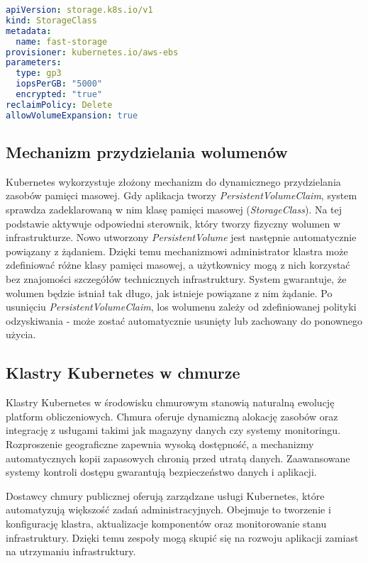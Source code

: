 \begin{lstlisting}[language=yaml,caption={Przykładowa definicja StorageClass},label={lst:sc-example}]
apiVersion: storage.k8s.io/v1
kind: StorageClass
metadata:
  name: fast-storage
provisioner: kubernetes.io/aws-ebs
parameters:
  type: gp3
  iopsPerGB: "5000"
  encrypted: "true"
reclaimPolicy: Delete
allowVolumeExpansion: true
\end{lstlisting}

\subsection{Mechanizm przydzielania wolumenów}
Kubernetes wykorzystuje złożony mechanizm do dynamicznego przydzielania zasobów pamięci masowej.
Gdy aplikacja tworzy \textit{PersistentVolumeClaim}, system sprawdza zadeklarowaną w nim klasę pamięci masowej (\textit{StorageClass}).
Na tej podstawie aktywuje odpowiedni sterownik, który tworzy fizyczny wolumen w infrastrukturze.
Nowo utworzony \textit{PersistentVolume} jest następnie automatycznie powiązany z żądaniem.
Dzięki temu mechanizmowi administrator klastra może zdefiniować różne klasy pamięci masowej, a użytkownicy mogą z nich korzystać bez znajomości szczegółów technicznych infrastruktury.
System gwarantuje, że wolumen będzie istniał tak długo, jak istnieje powiązane z nim żądanie.
Po usunięciu \textit{PersistentVolumeClaim}, los wolumenu zależy od zdefiniowanej polityki odzyskiwania - może zostać automatycznie usunięty lub zachowany do ponownego użycia.

\subsection{Klastry Kubernetes w chmurze}

Klastry Kubernetes w środowisku chmurowym stanowią naturalną ewolucję platform obliczeniowych.
Chmura oferuje dynamiczną alokację zasobów oraz integrację z usługami takimi jak magazyny danych czy systemy monitoringu.
Rozproszenie geograficzne zapewnia wysoką dostępność, a mechanizmy automatycznych kopii zapasowych chronią przed utratą danych.
Zaawansowane systemy kontroli dostępu gwarantują bezpieczeństwo danych i aplikacji.

Dostawcy chmury publicznej oferują zarządzane usługi Kubernetes, które automatyzują większość zadań administracyjnych.
Obejmuje to tworzenie i konfigurację klastra, aktualizacje komponentów oraz monitorowanie stanu infrastruktury.
Dzięki temu zespoły mogą skupić się na rozwoju aplikacji zamiast na utrzymaniu infrastruktury.

